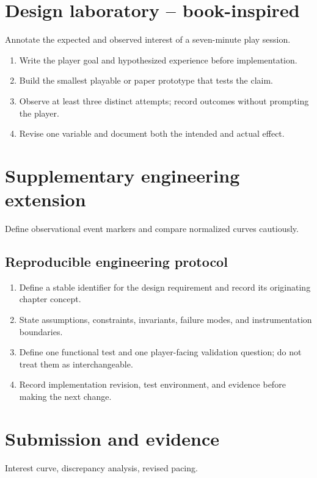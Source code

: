 \documentclass[11pt]{article}
\begin{document}
\section{Design laboratory -- book-inspired}
Annotate the expected and observed interest of a seven-minute play session.

\begin{enumerate}
\item Write the player goal and hypothesized experience before implementation.
\item Build the smallest playable or paper prototype that tests the claim.
\item Observe at least three distinct attempts; record outcomes without prompting the player.
\item Revise one variable and document both the intended and actual effect.
\end{enumerate}

\section{Supplementary engineering extension}
Define observational event markers and compare normalized curves cautiously.


\subsection{Reproducible engineering protocol}
\begin{enumerate}
\item Define a stable identifier for the design requirement and record its originating chapter concept.
\item State assumptions, constraints, invariants, failure modes, and instrumentation boundaries.
\item Define one functional test and one player-facing validation question; do not treat them as interchangeable.
\item Record implementation revision, test environment, and evidence before making the next change.
\end{enumerate}

\section{Submission and evidence}
Interest curve, discrepancy analysis, revised pacing.
\end{document}
